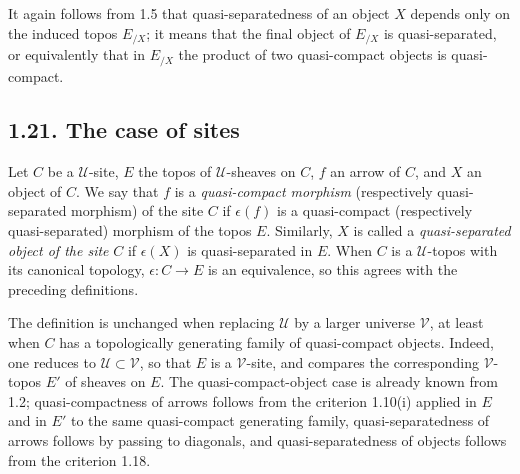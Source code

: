 \documentclass[11pt]{article}
\newcommand{\U}{\mathcal{U}}
\newcommand{\V}{\mathcal{V}}
\begin{document}
It again follows from 1.5 that quasi-separatedness of an object \(X\) depends only on the induced topos \(E_{/X}\); it means that the final object of \(E_{/X}\) is quasi-separated, or equivalently that in \(E_{/X}\) the product of two quasi-compact objects is quasi-compact.

\subsection*{1.21. The case of sites}

Let \(C\) be a \(\U\)-site, \(E\) the topos of \(\U\)-sheaves on \(C\), \(f\) an arrow of \(C\), and \(X\) an object of \(C\). We say that \(f\) is a \emph{quasi-compact morphism} (respectively quasi-separated morphism) of the site \(C\) if \(\epsilon(f)\) is a quasi-compact (respectively quasi-separated) morphism of the topos \(E\). Similarly, \(X\) is called a \emph{quasi-separated object of the site} \(C\) if \(\epsilon(X)\) is quasi-separated in \(E\). When \(C\) is a \(\U\)-topos with its canonical topology, \(\epsilon:C\to E\) is an equivalence, so this agrees with the preceding definitions.

The definition is unchanged when replacing \(\U\) by a larger universe \(\V\), at least when \(C\) has a topologically generating family of quasi-compact objects. Indeed, one reduces to \(\U\subset\V\), so that \(E\) is a \(\V\)-site, and compares the corresponding \(\V\)-topos \(E'\) of sheaves on \(E\). The quasi-compact-object case is already known from 1.2; quasi-compactness of arrows follows from the criterion 1.10(i) applied in \(E\) and in \(E'\) to the same quasi-compact generating family, quasi-separatedness of arrows follows by passing to diagonals, and quasi-separatedness of objects follows from the criterion 1.18.

\bigskip
\end{document}
